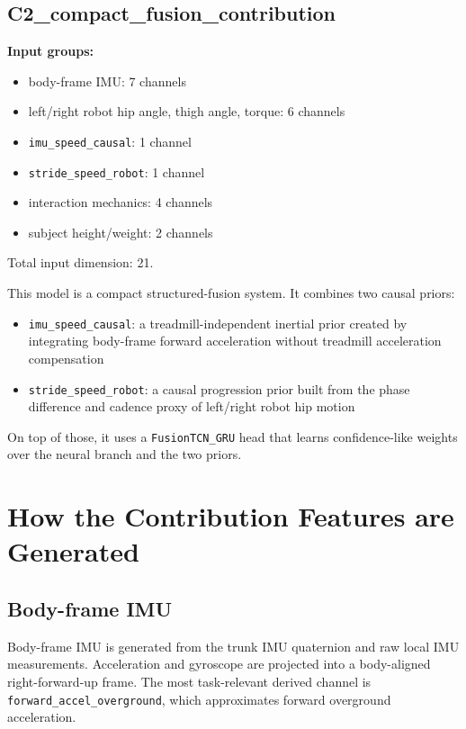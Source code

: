 \documentclass[11pt,a4paper]{article}
\begin{document}
\subsection{C2\_compact\_fusion\_contribution}

\textbf{Input groups:}
\begin{itemize}
\item body-frame IMU: 7 channels
\item left/right robot hip angle, thigh angle, torque: 6 channels
\item \texttt{imu\_speed\_causal}: 1 channel
\item \texttt{stride\_speed\_robot}: 1 channel
\item interaction mechanics: 4 channels
\item subject height/weight: 2 channels
\end{itemize}

Total input dimension: 21.

This model is a compact structured-fusion system. It combines two causal priors:
\begin{itemize}
\item \texttt{imu\_speed\_causal}: a treadmill-independent inertial prior created by integrating body-frame forward acceleration without treadmill acceleration compensation
\item \texttt{stride\_speed\_robot}: a causal progression prior built from the phase difference and cadence proxy of left/right robot hip motion
\end{itemize}

On top of those, it uses a \texttt{FusionTCN\_GRU} head that learns confidence-like weights over the neural branch and the two priors.

\section{How the Contribution Features are Generated}

\subsection{Body-frame IMU}

Body-frame IMU is generated from the trunk IMU quaternion and raw local IMU measurements.
Acceleration and gyroscope are projected into a body-aligned right-forward-up frame.
The most task-relevant derived channel is \texttt{forward\_accel\_overground}, which approximates forward overground acceleration.
\end{document}
